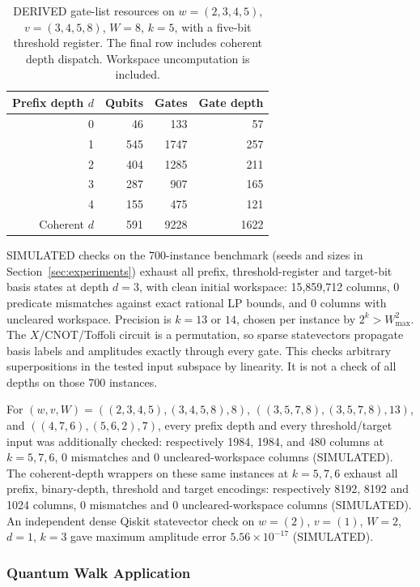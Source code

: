 \documentclass[pdflatex,sn-mathphys-num]{sn-jnl}
\begin{document}
\begin{table}[t]
\caption{DERIVED gate-list resources on $w=(2,3,4,5)$, $v=(3,4,5,8)$, $W=8$, $k=5$, with a five-bit threshold register. The final row includes coherent depth dispatch. Workspace uncomputation is included.}
\label{tab:h_resources}
\centering
\begin{tabular}{rrrr}
\toprule
Prefix depth $d$ & Qubits & Gates & Gate depth \\
\midrule
0 & 46 & 133 & 57 \\
1 & 545 & 1747 & 257 \\
2 & 404 & 1285 & 211 \\
3 & 287 & 907 & 165 \\
4 & 155 & 475 & 121 \\
Coherent $d$ & 591 & 9228 & 1622 \\
\bottomrule
\end{tabular}
\end{table}

SIMULATED checks on the 700-instance benchmark (seeds and sizes in Section~\ref{sec:experiments}) exhaust all prefix, threshold-register and target-bit basis states at depth $d=3$, with clean initial workspace: 15,859,712 columns, 0 predicate mismatches against exact rational LP bounds, and 0 columns with uncleared workspace. Precision is $k=13$ or $14$, chosen per instance by $2^k>W_{\max}^2$. The $X$/CNOT/Toffoli circuit is a permutation, so sparse statevectors propagate basis labels and amplitudes exactly through every gate. This checks arbitrary superpositions in the tested input subspace by linearity. It is not a check of all depths on those 700 instances.

For $(w,v,W)=((2,3,4,5),(3,4,5,8),8)$, $((3,5,7,8),(3,5,7,8),13)$, and $((4,7,6),(5,6,2),7)$, every prefix depth and every threshold/target input was additionally checked: respectively 1984, 1984, and 480 columns at $k=5,7,6$, 0 mismatches and 0 uncleared-workspace columns (SIMULATED). The coherent-depth wrappers on these same instances at $k=5,7,6$ exhaust all prefix, binary-depth, threshold and target encodings: respectively 8192, 8192 and 1024 columns, 0 mismatches and 0 uncleared-workspace columns (SIMULATED). An independent dense Qiskit statevector check on $w=(2)$, $v=(1)$, $W=2$, $d=1$, $k=3$ gave maximum amplitude error $5.56\times10^{-17}$ (SIMULATED).

\subsubsection{Quantum Walk Application}
\end{document}

